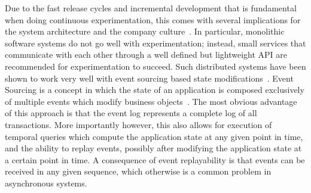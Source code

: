 Due to the fast release cycles and incremental development that is fundamental when doing continuous experimentation, this comes with several implications for the system architecture and the company culture~\cite{Lindgren2015,Olsson2012}.
In particular, monolithic software systems do not go well with experimentation; instead, small services that communicate with each other through a well defined but lightweight API are recommended for experimentation to succeed.
Such distributed systems have been shown to work very well with event sourcing based state modifications~\cite{???}.
Event Sourcing is a concept in which the state of an application is composed exclusively of multiple events which modify business objects~\cite{WEB:Fowler:2005}.
The most obvious advantage of this approach is that the event log represents a complete log of all transactions.
More importantly however, this also allows for execution of temporal queries which compute the application state at any given point in time, and the ability to replay events, possibly after modifying the application state at a certain point in time.
A consequence of event replayability is that events can be received in any given sequence, which otherwise is a common problem in asynchronous systems.
